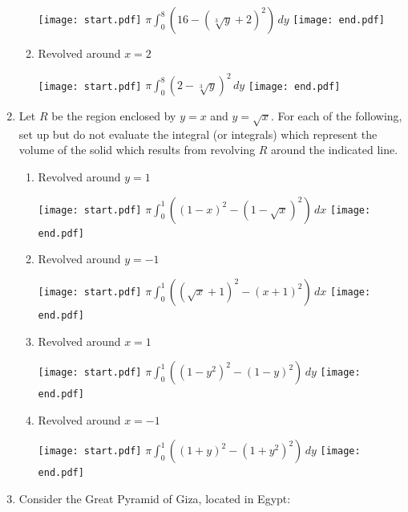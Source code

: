 \documentclass[12pt]{article}
\begin{document}
\begin{enumerate}
\begin{enumerate}
\texttt{[image: start.pdf]}
{{$\pi \int_0^8 \left(16-(\sqrt[3]{y}+2)^2\right)\,dy$}}
\texttt{[image: end.pdf]}


\item Revolved around $x=2$

\texttt{[image: start.pdf]}
{{$\pi \int_0^8 (2-\sqrt[3]{y})^2 \,dy$}}
\texttt{[image: end.pdf]}


\end{enumerate}

\item Let $R$ be the region enclosed by $y=x$ and $y=\sqrt{x}$.  For each of the following, set up but do not evaluate the integral (or integrals) which represent the volume of the solid which results from revolving $R$ around the indicated line.

\begin{enumerate}

\item Revolved around $y=1$

\texttt{[image: start.pdf]}
{{$\pi \int_0^1 \left((1-x)^2-(1-\sqrt{x})^2\right)\,dx$}}
\texttt{[image: end.pdf]}


\item Revolved around $y=-1$

\texttt{[image: start.pdf]}
{{$\pi \int_0^1 \left((\sqrt{x}+1)^2-(x+1)^2\right)\,dx$}}
\texttt{[image: end.pdf]}


\item Revolved around $x=1$

\texttt{[image: start.pdf]}
{{$\pi \int_0^1 \left((1-y^2)^2-(1-y)^2\right)\,dy$}}
\texttt{[image: end.pdf]}


\item Revolved around $x=-1$

\texttt{[image: start.pdf]}
{{$\pi \int_0^1 \left((1+y)^2-(1+y^2)^2\right)\,dy$}}
\texttt{[image: end.pdf]}


\end{enumerate}

\item Consider the Great Pyramid of Giza, located in Egypt:


\end{enumerate}
\end{document}
